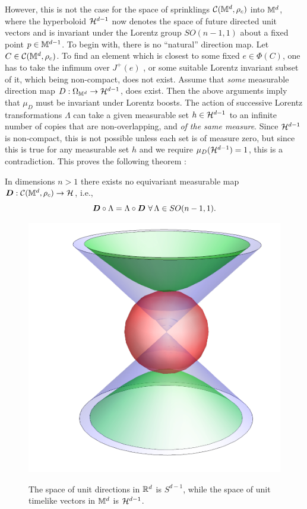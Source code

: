 However, this is not the case for the space of  sprinklings $\mathcal C({\mathbb M^d},\rho_c)$ into $\mathbb M^d$, where the hyperboloid  $\mathcal H^{d-1}$ now
denotes  the space of future directed unit vectors and is invariant under the Lorentz group $SO(n-1,1)$ about a fixed
point $p\in \mathbb M^{d-1}$.  To begin with, there is no  ``natural'' direction map. Let $C \in \mathcal C(\mathbb M^d,\rho_c)$.  To find an element  which is
closest to some fixed $e \in \Phi(C)$, one has to take the infimum over $J^+(e)$ , or some suitable Lorentz invariant
subset of it, which being non-compact, does not exist.  Assume that \emph{some} measurable direction map $D: \Omega_{\mathbb M^d} \rightarrow \mathcal H^{d-1}$,  does exist.  Then the above arguments imply  that $\mu_D$ must be invariant under Lorentz boosts. The
action of successive Lorentz transformations $\Lambda$ can take a given
measurable set $h \in \mathcal H^{d-1}$ to an infinite number of copies that are
non-overlapping, and \emph{of the same measure}. Since $\mathcal H^{d-1}$ is non-compact,  this is not  possible  unless each set is of measure zero, but since this is true for any measurable set $h$ and we require $\mu_D(\mathcal H^{d-1})=1$, this is a contradiction.  This proves the following theorem \citep{bomhensor}:   

\begin{theorem} In dimensions $n>1$ there exists no equivariant
measurable map $\vD: \cC(\mink^d,\rc) \rightarrow \cH$, i.e., 
\begin{equation} 
\vD \circ \Lambda = \Lambda \circ \vD \, \, \forall \, \Lambda \in
SO(n-1,1).  
\end{equation}   
\end{theorem}

\begin{figure}[ht]
\centering \resizebox{2in}{!}  {\includegraphics[width=\textwidth]{Directions}}
\caption{The space of unit directions in $\mathbb R^d$ is $S^{d-1}$, while the space of unit timelike vectors in $\mathbb M^d
  $ is $\mathcal H^{d-1}$.}
\label{Directions.fig}
\end{figure}

